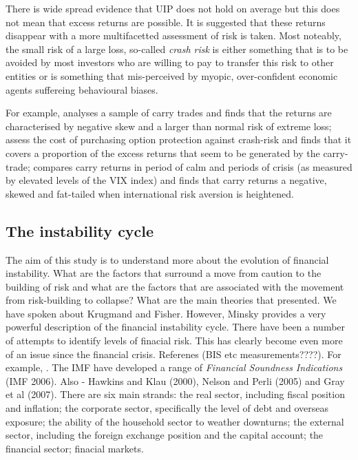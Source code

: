 \documentclass[12pt, a4paper, oneside]{article} %
\begin{document}
There is wide spread evidence that UIP does not hold on average but this does not mean that excess returns are possible.  It is suggested that these returns disappear with a more multifacetted assessment of risk is taken.  Most noteably, the small risk of a large loss, so-called \emph{crash risk} is either something that is to be avoided by most investors who are willing to pay to transfer this risk to other entities or is something that mis-perceived by myopic, over-confident economic agents suffereing behavioural biases.  

For example, \citet{BrunnermeierCarry} analyses a sample of carry trades and finds that the returns are characterised by negative skew and a larger than normal risk of extreme loss;\citet{JurekCrash} assess the cost of purchasing option protection against crash-risk and finds that it covers a proportion of the excess returns that seem to be generated by the carry-trade; %
compares carry returns in period of calm and periods of crisis (as measured by elevated levels of the VIX index) and finds that carry returns a negative, skewed and fat-tailed when international risk aversion is heightened.  



\subsection{The instability cycle}
The aim of this study is to understand more about the evolution of financial instability.  What are the factors that surround a move from caution to the building of risk and what are the factors that are associated with the movement from risk-building to collapse?  What are the main theories that presented.  We have spoken about Krugmand and Fisher.  However, Minsky provides a very powerful description of the financial instability cycle.   There have been a number of attempts to identify levels of finacial risk.  This has clearly become even more of an issue since the financial crisis. Referenes (BIS etc measurements????).  For example, \citet{IFCMeasure}.  The IMF have developed a range of \emph{Financial Soundness Indications} (IMF 2006).     Also - Hawkins and Klau (2000), Nelson and Perli (2005) and Gray et al (2007).  There are six main strands:  the real sector, including fiscal position and inflation; the corporate sector, specifically the level of debt and overseas exposure; the ability of the household sector to weather downturns; the external sector, including the foreign exchange position and the capital account; the financial sector; finacial markets. 
\end{document}
